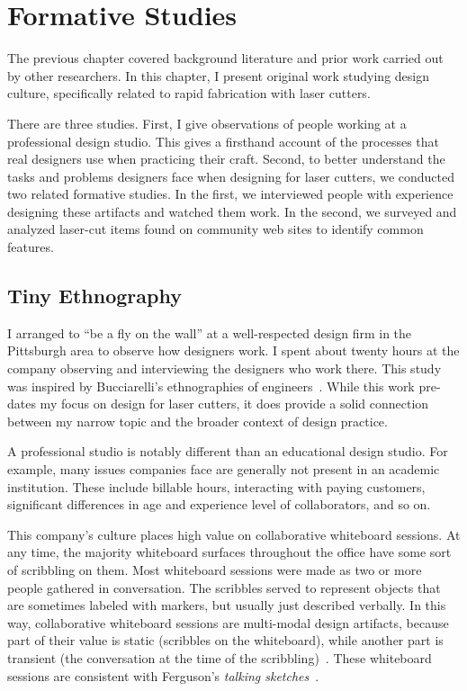 \chapter{Formative Studies}
\label{sec:formative}


The previous chapter covered background literature and prior work
carried out by other researchers. In this chapter, I present original
work studying design culture, specifically related to rapid
fabrication with laser cutters.

There are three studies. First, I give observations of people working
at a professional design studio. This gives a firsthand account of the
processes that real designers use when practicing their craft. Second,
to better understand the tasks and problems designers face when
designing for laser cutters, we conducted two related formative
studies.  In the first, we interviewed people with experience
designing these artifacts and watched them work. In the second, we
surveyed and analyzed laser-cut items found on community web sites to
identify common features.

\section{Tiny Ethnography}
\label{sec:formative-tiny-ethnography}

I arranged to ``be a fly on the wall'' at a well-respected design firm
in the Pittsburgh area to observe how designers work. I spent about
twenty hours at the company observing and interviewing the designers
who work there. This study was inspired by Bucciarelli's ethnographies
of engineers~\cite{bucciarelli-designing-engineers}. While this work
pre-dates my focus on design for laser cutters, it does provide a
solid connection between my narrow topic and the broader context of
design practice.

A professional studio is notably different than an educational design
studio. For example, many issues companies face are generally not
present in an academic institution. These include billable hours,
interacting with paying customers, significant differences in age and
experience level of collaborators, and so on. 

This company's culture places high value on collaborative whiteboard
sessions. At any time, the majority whiteboard surfaces throughout the
office have some sort of scribbling on them. Most whiteboard sessions
were made as two or more people gathered in conversation. The
 scribbles served to represent objects that are sometimes
labeled with markers, but usually just described verbally. In this
way, collaborative whiteboard sessions are multi-modal design
artifacts, because part of their value is static (scribbles on the
whiteboard), while another part is transient (the conversation at the
time of the scribbling)~\cite{ju-navigator}. These whiteboard sessions
are consistent with Ferguson's \textit{talking
  sketches}~\cite{ferguson-engineering}.

